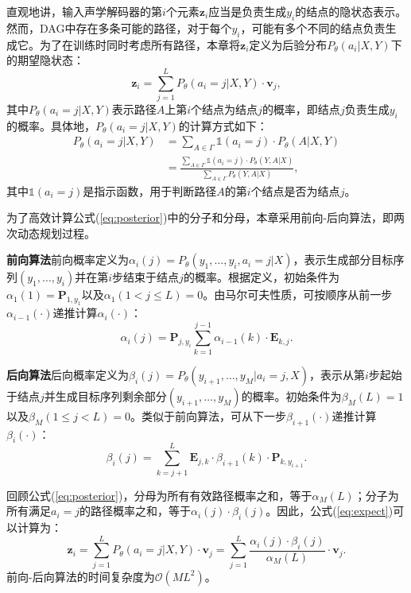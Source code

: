 直观地讲，输入声学解码器的第$i$个元素$\mathbf{z}_i$应当是负责生成$y_i$的结点的隐状态表示。然而，DAG中存在多条可能的路径，对于每个$y_i$，可能有多个不同的结点负责生成它。为了在训练时同时考虑所有路径，本章将$\mathbf{z}_i$定义为后验分布$P_\theta(a_i|X,Y)$下的期望隐状态：
\begin{equation}
    \mathbf{z}_i=\sum_{j=1}^L P_\theta(a_i=j|X,Y)\cdot \mathbf{v}_j,\label{eq:expect}
\end{equation}
其中$P_\theta(a_i=j|X,Y)$表示路径$A$上第$i$个结点为结点$j$的概率，即结点$j$负责生成$y_i$的概率。具体地，$P_\theta(a_i=j|X,Y)$的计算方式如下：
\begin{align}
    P_\theta(a_i=j|X, Y) &= \sum_{A\in\Gamma} \mathbb{1}(a_i=j)\cdot P_\theta(A|X,Y) \nonumber \\
                         &= \frac{\sum_{A\in\Gamma} \mathbb{1}(a_i=j)\cdot P_\theta(Y, A|X)}{\sum_{A\in\Gamma} P_\theta(Y, A|X)}, \label{eq:posterior}
\end{align}
其中$\mathbb{1}(a_i=j)$是指示函数，用于判断路径$A$的第$i$个结点是否为结点$j$。

为了高效计算公式(\ref{eq:posterior})中的分子和分母，本章采用前向-后向算法\citep{hiddenmarkovmodel}，即两次动态规划过程。

\textbf{前向算法}\quad 前向概率定义为$\alpha_i(j) = P_\theta(y_1, \ldots, y_i, a_i=j | X)$，表示生成部分目标序列$(y_1, \ldots, y_i)$并在第$i$步结束于结点$j$的概率。根据定义，初始条件为$\alpha_1(1)=\mathbf{P}_{1, y_1}$以及$\alpha_1(1<j\leq L)=0$。由马尔可夫性质，可按顺序从前一步$\alpha_{i-1}(\cdot)$递推计算$\alpha_i(\cdot)$：
\begin{equation}
    \alpha_i(j) = \mathbf{P}_{j,y_i} \sum_{k=1}^{j-1} \alpha_{i-1}(k)\cdot \mathbf{E}_{k,j}.
\end{equation}

\textbf{后向算法}\quad 后向概率定义为$\beta_i(j) = P_\theta(y_{i+1}, \ldots, y_M | a_i=j, X)$，表示从第$i$步起始于结点$j$并生成目标序列剩余部分$(y_{i+1}, \ldots, y_M)$的概率。初始条件为$\beta_M(L)=1$以及$\beta_M(1\leq j<L)=0$。类似于前向算法，可从下一步$\beta_{i+1}(\cdot)$递推计算$\beta_i(\cdot)$：
\begin{equation}
    \beta_i(j) = \sum_{k=j+1}^L \mathbf{E}_{j,k} \cdot \beta_{i+1}(k) \cdot \mathbf{P}_{k, y_{i+1}}.
\end{equation}

回顾公式(\ref{eq:posterior})，分母为所有有效路径概率之和，等于$\alpha_{M}(L)$；分子为所有满足$a_i=j$的路径概率之和，等于$\alpha_i(j)\cdot \beta_i(j)$。因此，公式(\ref{eq:expect})可以计算为：
\begin{equation}
    \mathbf{z}_i = \sum_{j=1}^L P_\theta(a_i=j|X,Y)\cdot \mathbf{v}_j = \sum_{j=1}^L \frac{\alpha_i(j)\cdot \beta_i(j)}{\alpha_M(L)}\cdot \mathbf{v}_j.
\end{equation}
前向-后向算法的时间复杂度为$\mathcal{O}(ML^2)$。

